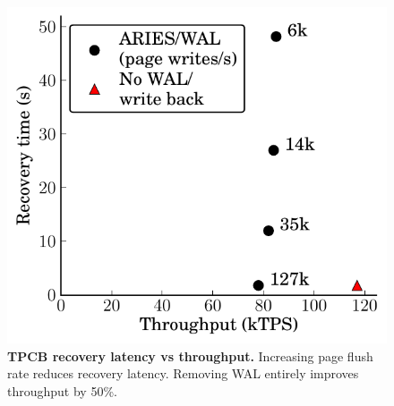\begin{figure}
  \centering
  \includegraphics[width=.6\linewidth]{OLTP_design/TPCB_Recovery.pdf}
  \caption{\textbf{TPCB recovery latency vs throughput.} Increasing page flush rate reduces recovery latency.  Removing WAL entirely improves throughput by 50\%.}
  \label{fig::Recovery}
\end{figure}
